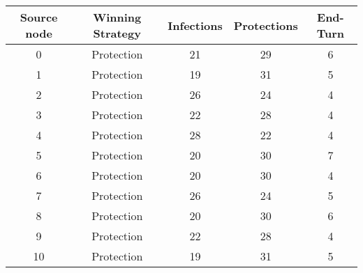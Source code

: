 \documentclass[results.tex]{subfiles}
\begin{document}
    \begin{center}
        \begin{tabular}{| c || c | c | c | c |}
            \hline
            {\bfseries Source node} & {\bfseries Winning Strategy} & {\bfseries Infections} & {\bfseries Protections}
            & {\bfseries End-Turn}
            \\  %
            \hline\hline
            0                       & Protection                   & 21                     & 29                      & 6                    \\
            \hline
            1                       & Protection                   & 19                     & 31                      & 5                    \\
            \hline
            2                       & Protection                   & 26                     & 24                      & 4                    \\
            \hline
            3                       & Protection                   & 22                     & 28                      & 4                    \\
            \hline
            4                       & Protection                   & 28                     & 22                      & 4                    \\
            \hline
            5                       & Protection                   & 20                     & 30                      & 7                    \\
            \hline
            6                       & Protection                   & 20                     & 30                      & 4                    \\
            \hline
            7                       & Protection                   & 26                     & 24                      & 5                    \\
            \hline
            8                       & Protection                   & 20                     & 30                      & 6                    \\
            \hline
            9                       & Protection                   & 22                     & 28                      & 4                    \\
            \hline
            10                      & Protection                   & 19                     & 31                      & 5                    \\

\end{tabular}
\end{center}
\end{document}
